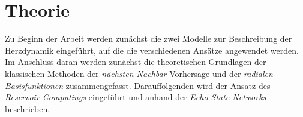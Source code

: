 \chapter{Theorie}
\label{ch:theory}
Zu Beginn der Arbeit werden zunächst die zwei Modelle zur Beschreibung der Herzdynamik eingeführt, auf die die verschiedenen Ansätze angewendet werden. Im Anschluss daran werden zunächst die theoretischen Grundlagen der klassischen Methoden der \textit{nächsten Nachbar} Vorhersage und der \textit{radialen Basisfunktionen} zusammengefasst. Darauffolgenden wird der Ansatz des \textit{Reservoir Computings} eingeführt und anhand der \textit{Echo State Networks} beschrieben.




